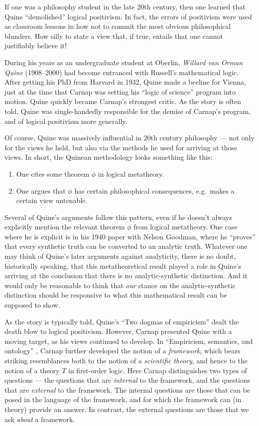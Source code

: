 If one was a philosophy student in the late 20th century, then one
learned that Quine ``demolished'' logical positivism.  In fact, the
errors of positivism were used as classroom lessons in how not to
commit the most obvious philosophical blunders.  How silly to state a
view that, if true, entails that one cannot justifiably believe it!

During his years as an undergraduate student at Oberlin, \emph{Willard
  van Orman Quine} (1908--2000) had become entranced with Russell's
mathematical logic.  After getting his PhD from Harvard in 1932, Quine
made a beeline for Vienna, just at the time that Carnap was setting
his ``logic of science'' program into motion.  Quine quickly became
Carnap's strongest critic.  As the story is often told, Quine was
single-handedly responsible for the demise of Carnap's program, and of
logical positivism more generally.

Of course, Quine was massively influential in 20th century philosophy
--- not only for the views he held, but also via the methods he used
for arriving at those views.  In short, the Quinean methodology looks
something like this:
\begin{enumerate}
\item One cites some theorem $\phi$ in logical metatheory.
\item One argues that $\phi$ has certain philosophical consequences,
  e.g.\ makes a certain view untenable.
\end{enumerate}
Several of Quine's arguments follow this pattern, even if he doesn't
always explicitly mention the relevant theorem $\phi$ from logical
metatheory.  One case where he is explicit is in his 1940 paper with
Nelson Goodman, where he ``proves'' that every synthetic truth can be
converted to an analytic truth.  Whatever one may think of Quine's
later arguments against analyticity, there is no doubt, historically
speaking, that this metatheoretical result played a role in Quine's
arriving at the conclusion that there is no analytic-synthetic
distinction.  And it would only be reasonable to think that {\it our}
stance on the analytic-synthetic distinction should be responsive to
what this mathematical result can be supposed to show.

As the story is typically told, Quine's ``Two dogmas of empiricism''
dealt the death blow to logical positivism.  However, Carnap presented
Quine with a moving target, as his views continued to develop.  In
``Empiricism, semantics, and ontology'' \citeyearpar{carnap-eso},
Carnap further developed the notion of a {\it framework}, which bears
striking resemblances both to the notion of a {\it scientific theory},
and hence to the notion of a theory $T$ in first-order logic.  Here
Carnap distinguishes two types of questions --- the questions that are
{\it internal} to the framework, and the questions that are {\it
  external} to the framework.  The internal questions are those that
can be posed in the language of the framework, and for which the
framework can (in theory) provide an answer.  In contrast, the
external questions are those that we ask {\it about} a framework.

